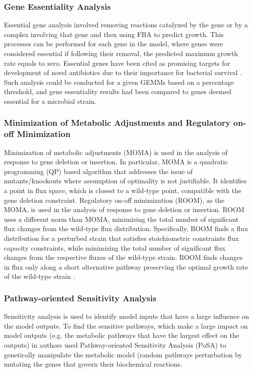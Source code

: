 \documentclass{article}
\begin{document}
\subsubsection{Gene Essentiality Analysis}

Essential gene analysis involved removing reactions catalyzed by the gene or by a complex involving that gene and then using FBA to predict growth. This processes can be performed for each gene in the model, where genes were considered essential if following their removal, the predicted maximum growth rate equals to zero. Essential genes have been cited as promising targets for development of novel antibiotics due to their importance for bacterial survival \cite{Kashaf}. Such analysis could be conducted for a given GEMMs based on a percentage threshold, and gene essentiality results had been compared to genes deemed essential for a microbial strain.

\subsubsection{Minimization of Metabolic Adjustments and Regulatory on-off Minimization}

Minimization of metabolic adjustments (MOMA) is used in the analysis of response to gene deletion or insertion. In particular, MOMA is a quadratic programming (QP) based algorithm that addresses the issue of mutants/knockouts where assumption of optimality is not justifiable. It identifies a point in flux space, which is closest to a wild-type point, compatible with the gene deletion constraint. Regulatory on-off minimization (ROOM), as the MOMA, is used in the analysis of response to gene deletion or insertion. ROOM uses a different norm than MOMA, minimizing the total number of significant flux changes from the wild-type flux distribution. Specifically, ROOM finds a flux distribution for a perturbed strain that satisfies stoichiometric constraints flux capacity constraints, while minimizing the total number of significant flux changes from the respective fluxes of the wild-type strain. ROOM finds changes in flux only along a short alternative pathway preserving the optimal growth rate of the wild-type strain \cite{Shlomi}.

\subsubsection{Pathway-oriented Sensitivity Analysis}

Sensitivity analysis is used to identify model inputs that have a large influence on the model outputs. To find the sensitive pathways, which make a large impact on model outputs (e.g. the metabolic pathways that have the largest effect on the outputs) in \cite{Kashaf} authors used Pathway-oriented Sensitivity Analysis (PoSA) to genetically manipulate the metabolic model (random pathways perturbation by mutating the genes that govern their biochemical reactions.
\end{document}
